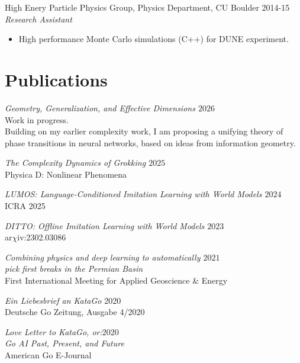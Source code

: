 \documentclass[margin]{res}
\begin{document}
\begin{resume}
                High Enery Particle Physics Group, Physics Department, CU Boulder  \hfill            2014-15 \\
		{\sl Research Assistant}
                 \begin{itemize}  \itemsep -2pt %
                 \item High performance Monte Carlo simulations (C++) for DUNE experiment.
                 \end{itemize}

                 \section{Publications}

                 {\sl Geometry, Generalization, and Effective Dimensions \hfill $2026$}\\
                 Work in progress.\\
                 Building on my earlier complexity work, I am proposing a unifying theory of phase transitions in neural networks, based on ideas from information geometry.

                 {\sl The Complexity Dynamics of Grokking \hfill $2025$}\\
                 Physica D: Nonlinear Phenomena

                 {\sl LUMOS: Language-Conditioned Imitation Learning with World Models \hfill $2024$}\\
                 ICRA 2025

                 {\sl DITTO: Offline Imitation Learning with World Models \hfill            $2023$}\\
                 ar$\chi$iv:2302.03086


                 {\sl Combining physics and deep learning to automatically \hfill            $2021$ \\ pick first breaks in the Permian Basin} \\
		First International Meeting for Applied Geoscience \& Energy

                {\sl Ein Liebesbrief an KataGo} \hfill 2020 \\
                Deutsche Go Zeitung, Ausgabe 4/2020

                {\sl Love Letter to KataGo, or:\hfill $2020$\\ Go AI Past, Present, and Future} \\
                American Go E-Journal


\end{resume}
\end{document}
